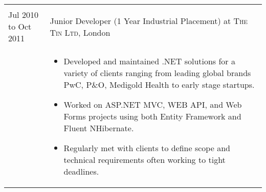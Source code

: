 \documentclass[a4paper,10pt]{article} %
\begin{document}
\begin{tabular}{ L{2cm} | L{11cm}}
\begin{itemize}[leftmargin=*]
\end{itemize} \\


Jul 2010 to Oct 2011 & Junior Developer (1 Year Industrial Placement) at \textsc{The Tin Ltd}, London \\








&\MPtrue	   
\begin{itemize}[leftmargin=*]


\item Developed and maintained .NET solutions for a variety of clients ranging from leading global brands PwC, P\&O, Medigold Health to early stage startups.

\item Worked on ASP.NET MVC, WEB API, and Web Forms projects using both Entity Framework and Fluent NHibernate.

\item Regularly met with clients to define scope and technical requirements often working to tight deadlines. 


\end{itemize}
\end{tabular}
\end{document}
